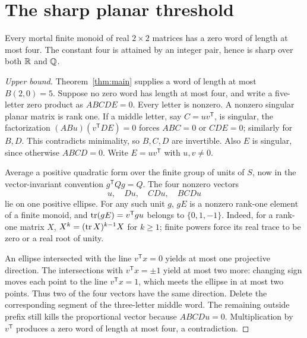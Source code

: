 \section{The sharp planar threshold}\label{sec:plane}
\begin{theorem}\label{thm:plane}
Every mortal finite monoid of real \(2\times2\) matrices has a zero word of length at most four. The constant four is attained by an integer pair, hence is sharp over both \(\mathbb R\) and \(\mathbb Q\).
\end{theorem}
\begin{proof}[Upper bound]
Theorem~\ref{thm:main} supplies a word of length at most \(B(2,0)=5\). Suppose no zero word has length at most four, and write a five-letter zero product as \(ABCDE=0\). Every letter is nonzero. A nonzero singular planar matrix is rank one. If a middle letter, say \(C=uv^{\mathsf T}\), is singular, the factorization
\((ABu)(v^{\mathsf T}DE)=0\) forces \(ABC=0\) or \(CDE=0\); similarly for \(B,D\). This contradicts minimality, so \(B,C,D\) are invertible. Also \(E\) is singular, since otherwise \(ABCD=0\). Write \(E=uv^{\mathsf T}\) with \(u,v\ne0\).

Average a positive quadratic form over the finite group of units of \(S\), now in the vector-invariant convention \(g^{\mathsf T}Qg=Q\). The four nonzero vectors
\[
 u,\quad Du,\quad CDu,\quad BCDu
\]
lie on one positive ellipse. For any such unit \(g\), \(gE\) is a nonzero rank-one element of a finite monoid, and \(\operatorname{tr}(gE)=v^{\mathsf T}gu\) belongs to \(\{0,1,-1\}\). Indeed, for a rank-one matrix \(X\), \(X^k=(\operatorname{tr} X)^{k-1}X\) for \(k\geq1\); finite powers force its real trace to be zero or a real root of unity.

An ellipse intersected with the line \(v^{\mathsf T}x=0\) yields at most one projective direction. The intersections with \(v^{\mathsf T}x=\pm1\) yield at most two more: changing sign moves each point to the line \(v^{\mathsf T}x=1\), which meets the ellipse in at most two points. Thus two of the four vectors have the same direction. Delete the corresponding segment of the three-letter middle word. The remaining outside prefix still kills the proportional vector because \(ABCDu=0\). Multiplication by \(v^{\mathsf T}\) produces a zero word of length at most four, a contradiction.
\end{proof}

